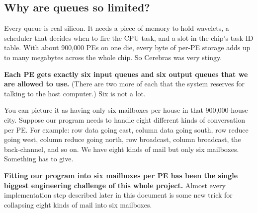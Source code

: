 \documentclass[11pt]{article}
\begin{document}
\begin{center}
\end{center}

\subsection{Why are queues so limited?}

Every queue is real silicon. It needs a piece of memory to hold
wavelets, a scheduler that decides when to fire the CPU task,
and a slot in the chip's task-ID table. With about 900{,}000
PEs on one die, every byte of per-PE storage adds up to many
megabytes across the whole chip. So Cerebras was very stingy.

\textbf{Each PE gets exactly six input queues and six output
queues that we are allowed to use.} (There are two more of each
that the system reserves for talking to the host computer.)
Six is not a lot.

You can picture it as having only six mailboxes per house in
that 900{,}000-house city. Suppose our program needs to handle
eight different kinds of conversation per PE. For example: row
data going east, column data going south, row reduce going
west, column reduce going north, row broadcast, column
broadcast, the back-channel, and so on. We have eight kinds of
mail but only six mailboxes. Something has to give.

\textbf{Fitting our program into six mailboxes per PE has been
the single biggest engineering challenge of this whole
project.} Almost every implementation step described later in
this document is some new trick for collapsing eight kinds of
mail into six mailboxes.
\end{document}
